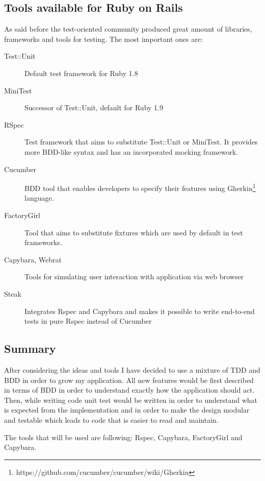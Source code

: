    \subsection{Tools available for Ruby on Rails}
      As said before the test-oriented community produced great amount of libraries, frameworks and tools for testing. The most
      important ones are:
        \begin{description}
          \item[Test::Unit] Default test framework for Ruby 1.8
          \item[MiniTest] Successor of Test::Unit, default for Ruby 1.9
          \item[RSpec] Test framework that aims to substitute Test::Unit or MiniTest. It provides more BDD-like syntax
            and has an incorporated mocking framework.
          \item[Cucumber] BDD tool that enables developers to specify their features using
            Gherkin\footnote{https://github.com/cucumber/cucumber/wiki/Gherkin} language.
          \item[FactoryGirl] Tool that aims to substitute fixtures which are used by default in test frameworks.
          \item[Capybara, Webrat] Tools for simulating user interaction with application via web browser
          \item[Steak] Integrates Rspec and Capybara and makes it possible to write end-to-end tests in pure Rspec instead 
            of Cucumber
        \end{description}
      
    \subsection{Summary}
      After considering the ideas and tools I have decided to use a mixture of TDD and BDD in order to grow my application.
      All new features would be first described in terms of BDD in order to understand exactly how the application should
      act. Then, while writing code unit test would be written in order to understand what is expected from the implementation
      and in order to make the design modular and testable which leads to code that is easier to read and maintain.
      
      The tools that will be used are following: Rspec, Capybara, FactoryGirl and Capybara.
    
      
    
        
    